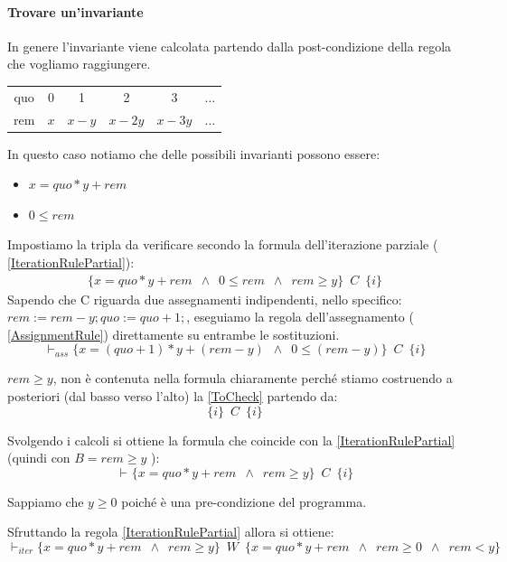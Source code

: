 \begin{esempio}
				      					\paragraph{Trovare un'invariante}
				      					\begin{nota}
				      					In genere l'invariante viene calcolata partendo dalla post-condizione della regola che vogliamo raggiungere.
				      					\end{nota} 
				      									      					\begin{table}[H]
				      						\centering
				      						\begin{tabular}[H]{c|ccccc}
				      							quo & 0   & 1     & 2      & 3      & $\ldots$ \\
				      							rem & $x$ & $x-y$ & $x-2y$ & $x-3y$ & $\ldots$ 
				      						\end{tabular}
				      					\end{table}

				      					In questo caso notiamo che delle possibili invarianti possono essere:
				      					\begin{itemize}
				      						\item $x=quo*y + rem$
				      						\item $0 \leq rem$
				      					\end{itemize}
				      					Impostiamo la tripla da verificare secondo la formula dell'iterazione parziale ( \ref{IterationRulePartial}):\\
				      					\begin{align}
				      						\{x=quo*y + rem\,\,\,\land\,\,\, 0 \leq rem\,\,\,\land\,\,\, rem\geq y\}\,\,\, C\,\,\,\{i\} 
				      						\label{ToCheck}                                                                          
				      					\end{align}
				      					Sapendo che C riguarda due assegnamenti indipendenti, nello specifico: $        rem := rem - y; quo := quo + 1;$, eseguiamo la regola dell'assegnamento ( \ref{AssignmentRule}) direttamente su entrambe le sostituzioni.
				      					\[\vdash_{ass}\{x=(quo+1)*y + (rem -y)\,\,\,\land\,\,\, 0 \leq (rem-y)\}\,\,\, C\,\,\,\{i\}\]
				      					
				  \begin{nota}
				   $rem \geq y $, non è contenuta nella formula chiaramente perché stiamo costruendo a posteriori (dal basso verso l'alto) la \ref{ToCheck} partendo da: \[\{i\}\,\,\, C\,\,\,\{i\}\]
				   \newline
				  \end{nota}
				      					Svolgendo i calcoli si ottiene la formula che coincide con la \ref{IterationRulePartial} (quindi con $B = rem\geq y$ ):
				      					\[\vdash_{}\{x=quo*y + rem\,\,\,\land\,\,\, rem\geq y\}\,\,\, C\,\,\,\{i\}\]
				      					\begin{nota}
				      					 Sappiamo che $y\geq0$ poiché è una pre-condizione del programma.
				      					\end{nota} 
				      					Sfruttando la regola \ref{IterationRulePartial} allora si ottiene:
				      					\[\vdash_{iter}\{x=quo*y + rem\,\,\,\land\,\,\, rem\geq y\}\,\,\, W\,\,\,\{x=quo*y + rem\,\,\,\land\,\,\, rem\geq 0\,\,\,\land\,\,\, rem<y\}\]

\end{esempio}

